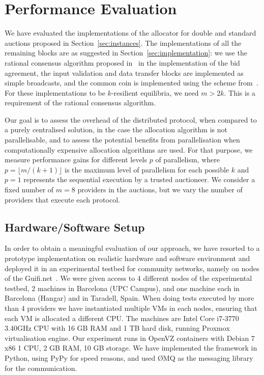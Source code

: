 
\section{Performance Evaluation}
\label{sec:evaluation}

We have evaluated the implementations of the allocator for double and standard auctions proposed in Section~\ref{sec:instances}.
The implementations of all the remaining blocks are as suggested in Section~\ref{sec:implementation}: we use the rational consensus algorithm proposed in~\cite{Afek:14} in the implementation of the bid agreement, the input validation and data transfer blocks are implemented as simple broadcasts, and the common coin is implemented using the scheme from~\cite{Abraham:13}. 
For these implementations to be $k$-resilient equilibria, we need $m>2k$. 
This is a requirement of the rational consensus algorithm. 

Our goal is to assess the overhead of the distributed protocol, when compared to a purely centralised solution, in the case the allocation algorithm is not parallelisable, 
and to assess the potential benefits from parallelisation when computationally expensive allocation algorithms are used. For that purpose, we measure performance gains for different levels $p$ of parallelism, where $p = \lfloor m/(k+1) \rfloor$ is the maximum level of parallelism for each possible $k$ and $p=1$ represents the sequential execution by a trusted auctioneer.
We consider a fixed number of $m=8$ providers in the auctions,
but we vary the number of providers that execute each protocol.

\subsection{Hardware/Software Setup}

In order to obtain a meaningful evaluation of our approach, we have resorted to a prototype implementation on realistic hardware and software environment and deployed it in an experimental testbed for community networks, namely on nodes of the Guifi.net~\cite{ClommunityTestbed}. 
We were given access to 4 different nodes of the experimental testbed, 2 machines in Barcelona (UPC Campus), and one machine each in Barcelona (Hangar) and in Taradell, Spain.
When doing tests executed by more than 4 providers we have instantiated 
multiple VMs in each nodes, ensuring that each VM is allocated a different CPU. 
The machines are Intel Core i7-3770 3.40GHz CPU with 16 GB RAM and 1 TB hard disk, running Proxmox virtualisation engine. 
Our experiment runs in OpenVZ containers with Debian 7 x86 1 CPU, 2 GB RAM, 10 GB storage. 
We have implemented the framework in Python, using PyPy for speed reasons, and used \O{}MQ\cite{ZeroMQ} as the messaging library for the communication.

